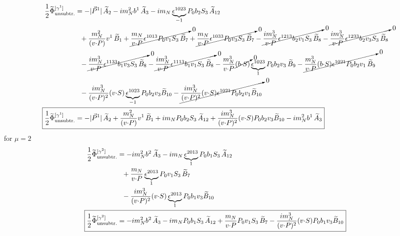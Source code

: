 \documentclass[]{article}
\numberwithin{equation}{section}
\newcommand{\tcdot}{{\cdot}}
\newcommand{\tAmp}{\widetilde{A}}
\newcommand{\tBmp}{\widetilde{B}}
\newcommand{\tAmp}{\ensuremath{\widetilde{A}^{(+)}}}
\newcommand{\tBmp}{\ensuremath{\widetilde{B}^{(+)}}}
\newcommand{\bvec}{b}
\newcommand{\mN}{m_N}
\newcommand{\unsub}{\text{unsubtr.}}
\begin{document}
\begin{align}
    \frac{1}{2}\widetilde \Phi^{[\gamma^{1}]}_{\unsub} & = 
		-|\vec{P}^1|\, \tAmp_2 - i \mN^2 \bvec^1\, \tAmp_3
		- i \mN \underbrace{\epsilon^{1 023}}_{-1} P_0 \bvec_2 S_3\, \tAmp_{12} \nonumber \\ &
		~~+ \frac{\mN^2}{(v \tcdot P)} v^1\, \tBmp_1 
		+ \cancelto{0}{\frac{\mN}{v \tcdot P} \epsilon^{1 013} P_0 v_1 S_3\, \tBmp_7  }+ \cancelto{0}{\frac{\mN}{v \tcdot P} \epsilon^{1 033} P_0 v_3 S_3\, \tBmp_7  }
		- \cancelto{0}{\frac{ i \mN^3}{v \tcdot P} \epsilon^{1 213} \bvec_2 v_1 S_3\, \tBmp_8}- \cancelto{0}{\frac{ i \mN^3}{v \tcdot P} \epsilon^{1 233} \bvec_2 v_3 S_3\, \tBmp_8} \nonumber \\ &
  ~~- \cancelto{0}{\frac{ i \mN^3}{v \tcdot P} \epsilon^{1 133} \bvec_1 v_3 S_3\, \tBmp_8}- \cancelto{0}{\frac{ i \mN^3}{v \tcdot P} \epsilon^{1 113} \bvec_1 v_1 S_3\, \tBmp_8}- \frac{\mN^3}{v \tcdot P} \cancelto{0}{(\bvec \tcdot S)} \underbrace{\epsilon^{1 023}}_{1} P_0 \bvec_2 v_3\, \tBmp_9- \cancelto{0}{\frac{\mN^3}{v \tcdot P} (\bvec \tcdot S) \epsilon^{1 021} P_0 \bvec_2 v_1\, \tBmp_9} \nonumber \\ &
		~~
		- \frac{i \mN^3}{(v \tcdot P)^2} (v \tcdot S) \underbrace{\epsilon^{1 023}}_{-1} P_0 \bvec_2 v_3 \tBmp_{10}- \cancelto{0}{\frac{i \mN^3}{(v \tcdot P)^2} (v \tcdot S) \epsilon^{1 021} P_0 \bvec_2 v_1 \tBmp_{10}}\\
  \Aboxed{ \frac{1}{2}\widetilde \Phi^{[\gamma^{1}]}_{\unsub} & =-|\vec{P}^1|\, \tAmp_2+ \frac{\mN^2}{(v \tcdot P)} v^1\, \tBmp_1 
		+ i \mN  P_0 \bvec_2 S_3\, \tAmp_{12}+ \frac{i \mN^3}{(v \tcdot P)^2} (v \tcdot S)  P_0 \bvec_2 v_3 \tBmp_{10}- i \mN^2 \bvec^1\, \tAmp_3}
\end{align}
for $\mu=2$
\begin{align}
    \frac{1}{2}\widetilde \Phi^{[\gamma^2]}_{\unsub} & = 
		 - i \mN^2 \bvec^2\, \tAmp_3
		- i \mN \underbrace{\epsilon^{2 0 1 3}}_{1} P_0 \bvec_1 S_3\, \tAmp_{12} \nonumber \\ &
		~~
		+ \frac{\mN}{v \tcdot P} \underbrace{\epsilon^{2 0 1 3}}_{1} P_0 v_1 S_3\, \tBmp_7  
		 \nonumber \\ &
		~~
		- \frac{i \mN^3}{(v \tcdot P)^2} (v \tcdot S) \underbrace{\epsilon^{2 0 1 3}}_{1} P_0 \bvec_1 v_3 \tBmp_{10}\\
  \Aboxed{\frac{1}{2}\widetilde \Phi^{[\gamma^2]}_{\unsub} & =- i \mN^2 \bvec^2\, \tAmp_3
		- i \mN  P_0 \bvec_1 S_3\, \tAmp_{12}+ \frac{\mN}{v \tcdot P}  P_0 v_1 S_3\, \tBmp_7- \frac{i \mN^3}{(v \tcdot P)^2} (v \tcdot S) P_0 \bvec_1 v_3 \tBmp_{10}}
\end{align}
\end{document}

